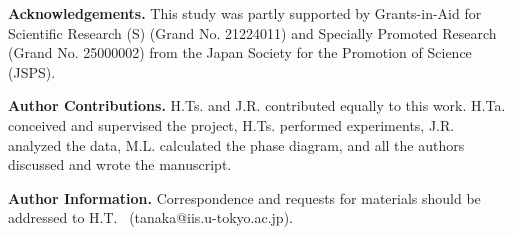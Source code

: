 \documentclass[preprint,amsmath,amssymb,superscriptaddress]{revtex4}
\begin{document}




\vspace{1cm}
\noindent
{\bf Acknowledgements.} This study was partly supported by Grants-in-Aid for Scientific Research (S) (Grand No. 21224011) and Specially Promoted Research (Grand No. 25000002) from the Japan Society for the Promotion of Science (JSPS). 

\noindent
{\bf Author Contributions.} 
H.Ts. and J.R. contributed equally to this work. 
H.Ta. conceived and supervised the project, H.Ts. performed experiments, J.R. analyzed the data, M.L. calculated the phase diagram, and all the authors discussed and wrote the manuscript. 

\noindent
{\bf Author Information.} 
Correspondence and requests for materials should be addressed to H.T. ~(tanaka@iis.u-tokyo.ac.jp).


\clearpage
\end{document}
